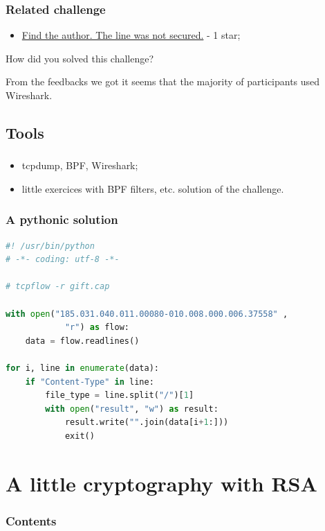 \documentclass[]{beamer}
\begin{document}
\begin{frame}
\frametitle{Related challenge}
\begin{itemize}
    \item \href{https://github.com/cscluxembourg/vestatech/blob/master/challenges/find-the-author/gift.cap}{Find the author. The line was not secured.} - 1 star;
\end{itemize}
\bigskip
How did you solved this challenge?

\bigskip
From the feedbacks we got it seems that the majority of participants used Wireshark.
\end{frame}




\subsection{Tools}
\begin{frame}
\frametitle{}
\begin{itemize}
    \item tcpdump, BPF, Wireshark;
    \item little exercices with BPF filters, etc. solution of the challenge.
\end{itemize}
\end{frame}


\begin{frame}[fragile]
\frametitle{A pythonic solution}
\begin{lstlisting}[language=Python]
#! /usr/bin/python
# -*- coding: utf-8 -*-

# tcpflow -r gift.cap

with open("185.031.040.011.00080-010.008.000.006.37558" ,
            "r") as flow:
    data = flow.readlines()

for i, line in enumerate(data):
    if "Content-Type" in line:
        file_type = line.split("/")[1]
        with open("result", "w") as result:
            result.write("".join(data[i+1:]))
            exit()
\end{lstlisting}
\end{frame}
 


 

 
 

 
%
%
\section{A little cryptography with RSA}
\begin{frame}
    \frametitle{Contents}
    \begin{columns}[t]
        \begin{column}{5cm}
            \tableofcontents[sections={1-2}, currentsection, hideothersubsections]
        \end{column}
        \begin{column}{5cm}
            \tableofcontents[sections={3-4}, currentsection, hideothersubsections]
        \end{column}
    \end{columns}
\end{frame}
\end{document}
